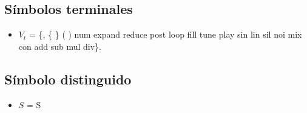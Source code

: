 \documentclass[a4paper]{article}
\begin{document}
\subsection{Símbolos terminales}
\begin{itemize}
\item \textbf{$V_t$} = \{, \{ \} ( ) num expand reduce post loop fill tune play sin lin sil noi mix con add sub mul div\}.
\end{itemize}

\subsection{Símbolo distinguido}
\begin{itemize}
\item \textbf{$S$} = S 
\end{itemize}
\end{document}
